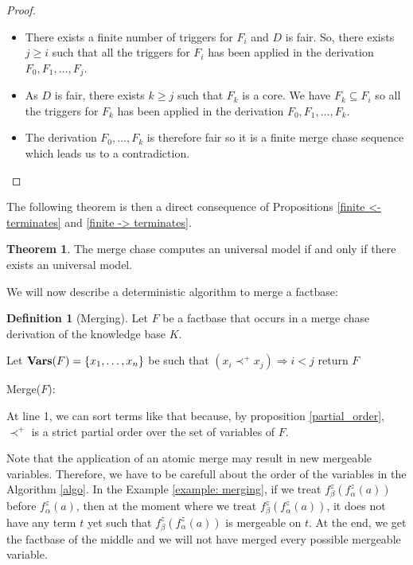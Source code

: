 \documentclass{article}
\theoremstyle{definition}
\newtheorem{definition}{Definition}[section]
\newtheorem{theorem}{Theorem}[section]
\theoremstyle{remark}
\newcommand{\Vars}{\textbf{Vars}}
\begin{document}
\begin{proof}
\begin{itemize}
\item There exists a finite number of triggers for $F_i$ and $D$ is fair. So, there exists $j \geq i$ such that all the triggers for $F_i$ has been applied in the derivation $F_0,F_1,\ldots,F_j$.

\item As $D$ is fair, there exists $k \geq j$ such that $F_k$ is a core. We have $F_k \subseteq F_i$ so all the triggers for $F_k$ has been applied in the derivation $F_0,F_1,\ldots,F_k$.
\item The derivation $F_0,\ldots,F_k$ is therefore fair so it is a finite merge chase sequence which leads us to a contradiction.
\end{itemize}
\end{proof}

The following theorem is then a direct consequence of Propositions \ref{finite <- terminates} and \ref{finite -> terminates}.

\begin{theorem}
The merge chase computes an universal model if and only if there exists an universal model.
\end{theorem}

We will now describe a deterministic algorithm to merge a factbase:

\begin{definition}[Merging]
Let $F$ be a factbase that occurs in a merge chase derivation of the knowledge base $K$.

\begin{algorithm}[H] \label{algo}
\SetAlgoLined


    Let $\textbf{\Vars}(F) = \{x_1,\ldots, x_n\}$ be such that $(x_i \prec^+ x_j) \Rightarrow i < j$ \;
return $F$
\caption{Merge($F$):}


\end{algorithm}
At line 1, we can sort terms like that because, by proposition \ref{partial_order}, $\prec^+$ is a strict partial order over the set of variables of $F$.
\end{definition}



Note that the application of an atomic merge may result in new mergeable variables. Therefore, we have to be carefull about the order of the variables in the Algorithm \ref{algo}. In the Example \ref{example: merging}, if we treat $f_\beta^z(f_\alpha^z(a))$ before $f_\alpha^z(a)$, then at the moment where we treat $f_\beta^z(f_\alpha^z(a))$, it does not have any term $t$ yet such that $f_\beta^z(f_\alpha^z(a))$ is mergeable on $t$. At the end, we get the factbase of the middle and we will not have merged every possible mergeable variable.
\end{document}
